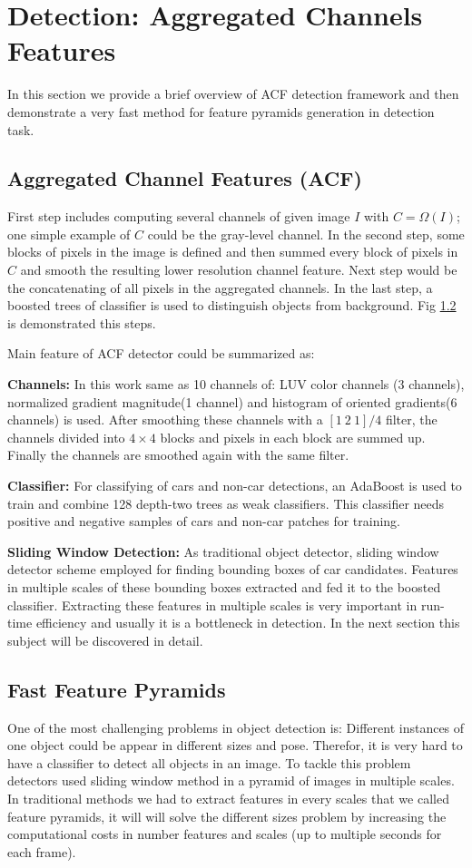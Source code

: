 \documentclass[conference]{IEEEtran}
\begin{document}
\section{Detection: Aggregated Channels Features}
In this section we provide a brief overview of ACF detection framework \cite{dollar2010fastest} and then demonstrate a very fast method for feature pyramids generation \cite{dollar2014fast} in detection task.
\subsection{Aggregated Channel Features (ACF)}
First step includes computing several channels of given image $I$ with $C=\Omega({I})$; one simple example of $C$ could be the gray-level channel. In the second step, some blocks of pixels in the image is defined and then summed every block of pixels in $C$ and smooth the resulting lower resolution channel feature. Next step would be the concatenating of all pixels in the aggregated channels. In the last step, a boosted trees of classifier is used to distinguish objects from background. Fig \ref{} is demonstrated this steps. 

Main feature of ACF detector could be summarized as:

\textbf{Channels:} In this work same as \cite{dollar2010fastest} 10 channels of: LUV color channels (3 channels), normalized gradient magnitude(1 channel) and histogram of oriented gradients(6 channels) is used. After smoothing these channels with a 
$[1\ 2\ 1]/4$ filter, 
the channels divided into $4 \times 4$ blocks and pixels in each block are summed up. Finally the channels are smoothed again with the same filter.

\textbf{Classifier:} For classifying of cars and non-car detections, an AdaBoost \cite{friedman2000additive} is used to train and combine 128 depth-two trees as weak classifiers. This classifier needs positive and negative samples of cars and non-car patches for training.

\textbf{Sliding Window Detection:} As traditional object detector, sliding window detector scheme employed for finding bounding boxes of car candidates. Features in multiple scales of these bounding boxes extracted and fed it to the boosted classifier. Extracting these features in multiple scales is very important in run-time efficiency and usually it is a bottleneck in detection. In the next section this subject will be discovered in detail.

\subsection{Fast Feature Pyramids}
One of the most challenging problems in object detection is: Different instances of one object could be appear in different sizes and pose. Therefor, it is very hard to have a classifier to detect all objects in an image. To tackle this problem detectors used sliding window method in a pyramid of images in multiple scales. In traditional methods we had to extract features in every scales that we called feature pyramids, it will will solve the different sizes problem by increasing the computational costs in number features and scales (up to multiple seconds for each frame).
\end{document}
